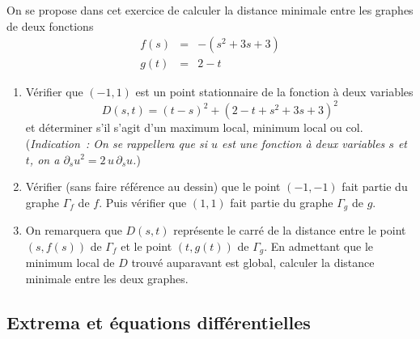 \begin{exo}

    On se propose dans cet exercice de calculer la distance minimale entre les graphes de deux fonctions
    \begin{eqnarray*}
        f\left( s\right)  &=&-(s^{2}+3s+3) \\
        g\left( t\right)  &=&2-t
    \end{eqnarray*}

    \begin{enumerate}
        \item Vérifier que $(-1,1)$ est un  point stationnaire de la fonction à deux variables
        \begin{equation*}
            D\left( s,t\right) =\left( t-s\right) ^{2}+\left( 2-t+s^{2}+3s+3\right) ^{2}
        \end{equation*}
        et déterminer s'il s'agit d'un maximum local, minimum local ou col.
        ({\em Indication~: On se rappellera que si $u$ est une fonction à deux variables $s$ et $t$, on a
        $\partial_s u^2 = 2\,u\, \partial_s u$.})
    \end{enumerate}

    \begin{enumerate}\setcounter{enumi}{1}
        \item Vérifier (sans faire référence au dessin) que le point $\left( -1,-1\right) $ fait partie du graphe $\Gamma _{f}$ de $f$.
        Puis vérifier que $\left(1,1\right)$ fait partie du graphe $\Gamma _{g}$ de $g$.
        \item On remarquera que $D(s,t)$ représente le carré de la distance entre le point $\left( s,f\left( s\right) \right) $ de $\Gamma _{f}$  et le point $\left( t,g\left( t\right) \right) $ de $\Gamma _{g}$.
        En admettant que le minimum local de $D$ trouvé auparavant est global, calculer la distance minimale entre les deux graphes.
    \end{enumerate}
\end{exo}

\subsection{Extrema et équations différentielles}


